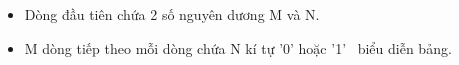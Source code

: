 \begin{itemize}
	\item     Dòng đầu tiên chứa 2 số nguyên dương M và N.   
	\item     M dòng tiếp theo mỗi dòng chứa N kí tự '0' hoặc '1'  biểu diễn bảng.   
\end{itemize}